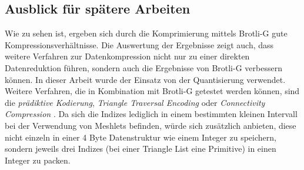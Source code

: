 \subsection{Ausblick für spätere Arbeiten}
\label{subsec:ausblick}
Wie zu sehen ist, ergeben sich durch die Komprimierung mittels Brotli-G gute Kompressionsverhältnisse.
Die Auswertung der Ergebnisse zeigt auch, dass weitere Verfahren zur Datenkompression nicht nur zu einer direkten Datenreduktion führen, sondern auch die Ergebnisse von Brotli-G verbessern können.
In dieser Arbeit wurde der Einsatz von der Quantisierung verwendet.
Weitere Verfahren, die in Kombination mit Brotli-G getestet werden können, sind die \textit{prädiktive Kodierung}, \textit{Triangle Traversal Encoding} oder \textit{Connectivity Compression} \cite{Jakob2017}.
Da sich die Indizes lediglich in einem bestimmten kleinen Intervall bei der Verwendung von Meshlets befinden, würde sich zusätzlich anbieten, diese nicht einzeln in einer 4 Byte Datenstruktur wie einem Integer zu speichern, sondern jeweils drei Indizes (bei einer Triangle List eine Primitive) in einen Integer zu packen. \newline

